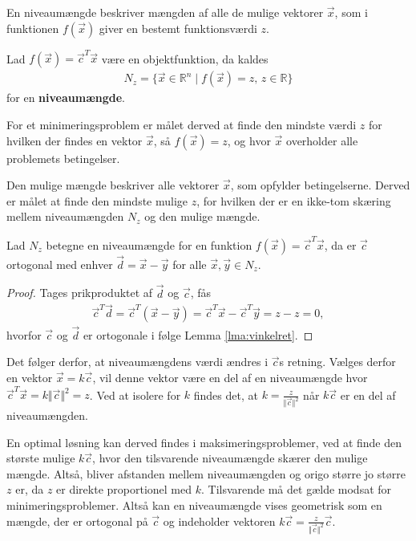 
En niveaumængde beskriver mængden af alle de mulige vektorer $\vec{x}$, som i funktionen $f(\vec{x})$ giver en bestemt funktionsværdi $z$. 
\begin{defn}[Niveaumængde]
Lad $f(\vec{x})= \vec{c}^T\vec{x}$ være en objektfunktion, da kaldes
\begin{align*}
N_z = \{\vec{x} \in \mathds{R}^n \mid f(\vec{x}) = z, \, z \in \mathds{R}\}
\end{align*}
for en \textbf{niveaumængde}.
\end{defn}



For et minimeringsproblem er målet derved at finde den mindste værdi $z$ for hvilken der findes en vektor $\vec{x}$, så $f(\vec{x})=z$, og hvor $\vec{x}$ overholder alle problemets betingelser.

Den mulige mængde beskriver alle vektorer $\vec{x}$, som opfylder betingelserne. Derved er målet at finde den mindste mulige $z$, for hvilken der er en ikke-tom skæring mellem niveaumængden $N_z$ og den mulige mængde.

\begin{stn}
Lad $N_z$ betegne en niveaumængde for en funktion $f(\vec{x})=\vec{c}^T\vec{x}$, da er $\vec{c}$ ortogonal med enhver $\vec{d}= \vec{x}-\vec{y}$ for alle $\vec{x}, \vec{y} \in N_z$. 
\end{stn}

\begin{proof}
Tages prikproduktet af $\vec{d}$ og $\vec{c}$, fås
\begin{align*}
\vec{c}^T\vec{d}=\vec{c}^T(\vec{x}-\vec{y}) = \vec{c}^T\vec{x} -\vec{c}^T\vec{y} = z - z = 0,
\end{align*}
hvorfor $\vec{c}$ og $\vec{d}$ er ortogonale i følge Lemma \ref{lma:vinkelret}.
\end{proof}
Det følger derfor, at niveaumængdens værdi ændres i $\vec{c}$s retning. 
Vælges derfor en vektor $\vec{x}=k\vec{c}$, vil denne vektor være en del af en niveaumængde hvor $\vec{c}^T\vec{x}=k\Vert\vec{c}\Vert^2=z$. Ved at isolere for $k$ findes det, at $k=\frac{z}{\Vert\vec{c}\Vert^2}$ når $k\vec{c}$ er en del af niveaumængden.


En optimal løsning kan derved findes i maksimeringsproblemer, ved at finde den største mulige $k\vec{c}$, hvor den tilsvarende niveaumængde skærer den mulige mængde. Altså, bliver afstanden mellem niveaumængden og origo større jo større $z$ er, da $z$ er direkte proportionel med $k$. Tilsvarende må det gælde modsat for minimeringsproblemer. 
Altså kan en niveaumængde vises geometrisk som en mængde, der er ortogonal på $\vec{c}$ og indeholder vektoren $k\vec{c}=\frac{z}{\Vert\vec{c}\Vert^2}\vec{c}$.

